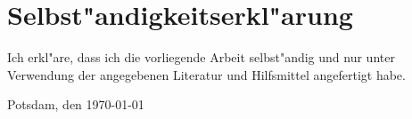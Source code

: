 
\chapter*{Selbst"andigkeitserkl"arung}

Ich erkl"are, dass ich die vorliegende Arbeit selbst"andig und nur unter Verwendung der angegebenen Literatur und Hilfsmittel angefertigt habe.

\vspace{2\baselineskip}
\noindent Potsdam, den \today \hfill\authorfirstname \authorsurname